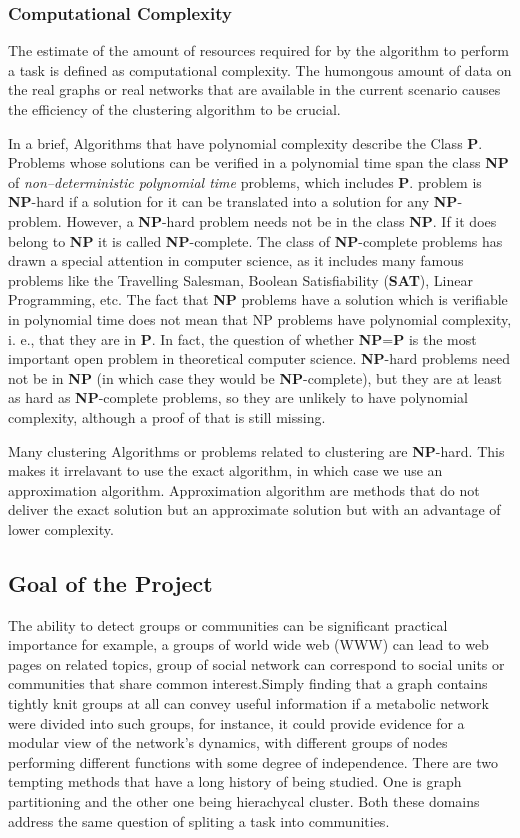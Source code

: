 \subsubsection{Computational Complexity}
 The estimate of the amount of resources required for by the algorithm to perform a task is defined as computational complexity. The humongous amount of data on the real graphs or real networks that are available in the current scenario causes the efficiency of the clustering algorithm to be crucial.
\par In a brief, Algorithms that have polynomial complexity describe the Class \textbf{P}. Problems whose solutions can be verified in a polynomial time span the class \textbf{NP} of \textit{non--deterministic polynomial time} problems, which includes \textbf{P}. problem is \textbf{NP}-hard if a solution for it can be
translated into a solution for any \textbf{NP}-problem. However,
a \textbf{NP}-hard problem needs not be in the class \textbf{NP}. If it
does belong to \textbf{NP} it is called \textbf{NP}-complete. The class
of \textbf{NP}-complete problems has drawn a special attention
in computer science, as it includes many famous problems like the Travelling Salesman, Boolean Satisfiability
(\textbf{SAT}), Linear Programming, etc.
The fact that \textbf{NP} problems have a solution which is verifiable in polynomial
time does not mean that NP problems have polynomial
complexity, i. e., that they are in \textbf{P}. In fact, the question of whether \textbf{NP}=\textbf{P} is the most important open problem in theoretical computer science. \textbf{NP}-hard problems
need not be in \textbf{NP} (in which case they would be \textbf{NP}-complete), but they are at least as hard as \textbf{NP}-complete
problems, so they are unlikely to have polynomial complexity, although a proof of that is still missing.
\par Many clustering Algorithms or problems related to clustering are \textbf{NP}-hard. This makes it irrelavant to use the exact algorithm, in which case we use an approximation algorithm. Approximation algorithm are methods that do not deliver the exact solution but an approximate solution but with an advantage of lower complexity. \cite{communitypaper}

\subsection{Goal of the Project}
The ability to detect groups or communities can be significant practical importance for example, a groups of world wide web (WWW) can lead to web pages on related topics, group of social network can correspond to social units or communities that share common interest.Simply finding that a graph contains tightly knit groups at all can convey useful information if a metabolic network were divided into such groups, for instance, it could provide evidence for a modular view of the network's dynamics, with different groups of nodes performing different functions with some degree of independence. There are two tempting methods that have a long history of being studied. One is graph partitioning and the other one being hierachycal cluster. Both these domains address the same question of spliting a task into communities.

